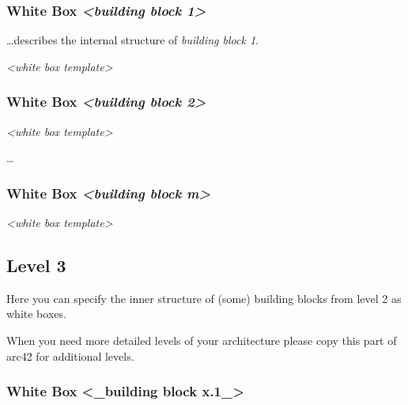 \documentclass[]{article}
\begin{document}
\hypertarget{_white_box_emphasis_building_block_1_emphasis}{%
\subsubsection{\texorpdfstring{White Box \emph{\textless{}building block
1\textgreater{}}}{White Box \textless{}building block 1\textgreater{}}}\label{_white_box_emphasis_building_block_1_emphasis}}

\ldots{}describes the internal structure of \emph{building block 1}.

\emph{\textless{}white box template\textgreater{}}

\hypertarget{_white_box_emphasis_building_block_2_emphasis}{%
\subsubsection{\texorpdfstring{White Box \emph{\textless{}building block
2\textgreater{}}}{White Box \textless{}building block 2\textgreater{}}}\label{_white_box_emphasis_building_block_2_emphasis}}

\emph{\textless{}white box template\textgreater{}}

\ldots{}

\hypertarget{_white_box_emphasis_building_block_m_emphasis}{%
\subsubsection{\texorpdfstring{White Box \emph{\textless{}building block
m\textgreater{}}}{White Box \textless{}building block m\textgreater{}}}\label{_white_box_emphasis_building_block_m_emphasis}}

\emph{\textless{}white box template\textgreater{}}

\hypertarget{_level_3}{%
\subsection{Level 3}\label{_level_3}}

Here you can specify the inner structure of (some) building blocks from
level 2 as white boxes.

When you need more detailed levels of your architecture please copy this
part of arc42 for additional levels.

\hypertarget{_white_box_building_block_x_1}{%
\subsubsection{White Box \textless{}\_building block
x.1\_\textgreater{}}\label{_white_box_building_block_x_1}}
\end{document}
